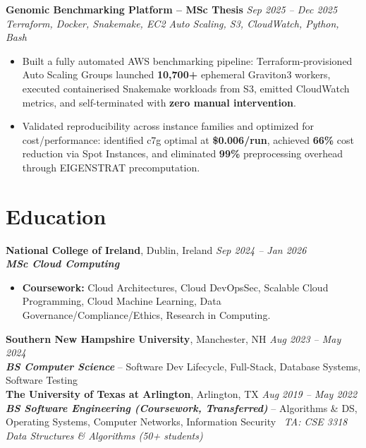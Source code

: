 \documentclass[10pt,a4paper]{article}
\newcommand{\projectentry}[3]{%
  \Needspace{3\baselineskip}%
  \textbf{#1} \hfill \textit{#2}\\[-0.15em]
  \textit{#3}\\[-0.25em]
}
\begin{document}
\vspace{0.10em}
\projectentry{Genomic Benchmarking Platform -- MSc Thesis}{Sep 2025 -- Dec 2025}{Terraform, Docker, Snakemake, EC2 Auto Scaling, S3, CloudWatch, Python, Bash}
\begin{itemize}
  \item Built a fully automated AWS benchmarking pipeline: Terraform-provisioned Auto Scaling Groups launched \textbf{10,700+} ephemeral Graviton3 workers, executed containerised Snakemake workloads from S3, emitted CloudWatch metrics, and self-terminated with \textbf{zero manual intervention}.
  \item Validated reproducibility across instance families and optimized for cost/performance: identified c7g optimal at \textbf{\$0.006/run}, achieved \textbf{66\%} cost reduction via Spot Instances, and eliminated \textbf{99\%} preprocessing overhead through EIGENSTRAT precomputation.
\end{itemize}

\section*{Education}
\textbf{National College of Ireland}, Dublin, Ireland \hfill \textit{Sep 2024 -- Jan 2026}\\[-0.15em]
\textbf{\textit{MSc Cloud Computing}}\\[-0.25em]
\begin{itemize}
  \item \textbf{Coursework:} Cloud Architectures, Cloud DevOpsSec, Scalable Cloud Programming, Cloud Machine Learning, Data Governance/Compliance/Ethics, Research in Computing.
\end{itemize} 

\vspace{0.12em}
\textbf{Southern New Hampshire University}, Manchester, NH \hfill \textit{Aug 2023 -- May 2024}\\[-0.15em]
\textbf{\textit{BS Computer Science}} -- Software Dev Lifecycle, Full-Stack, Database Systems, Software Testing\\[0.05em]

\textbf{The University of Texas at Arlington}, Arlington, TX \hfill \textit{Aug 2019 -- May 2022}\\[-0.15em]
\textbf{\textit{BS Software Engineering (Coursework, Transferred)}} -- Algorithms \& DS, Operating Systems, Computer Networks, Information Security \textbar\ \textit{TA: CSE 3318 Data Structures \& Algorithms (50+ students)}
\end{document}
